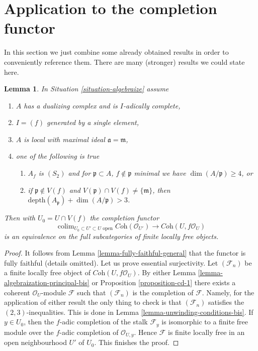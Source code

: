 \documentclass{stacks-project}
\theoremstyle{plain}
\newtheorem{lemma}[subsection]{Lemma}
\theoremstyle{definition}
\theoremstyle{remark}
\numberwithin{equation}{subsection}
\def\colim{\mathop{\mathrm{colim}}\nolimits}
\begin{document}
\section{Application to the completion functor}
\label{section-completion-application}

\noindent
In this section we just combine some already obtained results
in order to conveniently reference them. There are many
(stronger) results we could state here.

\begin{lemma}
\label{lemma-equivalence-better}
In Situation \ref{situation-algebraize} assume
\begin{enumerate}
\item $A$ has a dualizing complex and is $I$-adically complete,
\item $I = (f)$ generated by a single element,
\item $A$ is local with maximal ideal $\mathfrak a = \mathfrak m$,
\item one of the following is true
\begin{enumerate}
\item $A_f$ is $(S_2)$ and for $\mathfrak p \subset A$,
$f \not \in \mathfrak p$ minimal we have $\dim(A/\mathfrak p) \geq 4$, or
\item if $\mathfrak p \not \in V(f)$ and
$V(\mathfrak p) \cap V(f) \not = \{\mathfrak m\}$, then
$\text{depth}(A_\mathfrak p) + \dim(A/\mathfrak p) > 3$.
\end{enumerate}
\end{enumerate}
Then with $U_0 = U \cap V(f)$ the completion functor
$$
\colim_{U_0 \subset U' \subset U\text{ open}}
\textit{Coh}(\mathcal{O}_{U'})
\longrightarrow
\textit{Coh}(U, f\mathcal{O}_U)
$$
is an equivalence on the full subcategories of finite locally free objects.
\end{lemma}

\begin{proof}
It follows from Lemma \ref{lemma-fully-faithful-general}
that the functor is fully faithful (details omitted).
Let us prove essential surjectivity. Let $(\mathcal{F}_n)$ be a finite locally
free object of $\textit{Coh}(U, f\mathcal{O}_U)$. By either
Lemma \ref{lemma-algebraization-principal-bis} or
Proposition \ref{proposition-cd-1}
there exists a coherent $\mathcal{O}_U$-module $\mathcal{F}$
such that $(\mathcal{F}_n)$ is the completion of $\mathcal{F}$.
Namely, for the application of either result the only thing to
check is that $(\mathcal{F}_n)$ satisfies the $(2, 3)$-inequalities.
This is done in Lemma \ref{lemma-unwinding-conditions-bis}. If $y \in U_0$,
then the $f$-adic completion of the stalk $\mathcal{F}_y$ is isomorphic to
a finite free module over the $f$-adic completion of $\mathcal{O}_{U, y}$.
Hence $\mathcal{F}$ is finite locally free in an open neighbourhood
$U'$ of $U_0$. This finishes the proof.
\end{proof}
\end{document}
